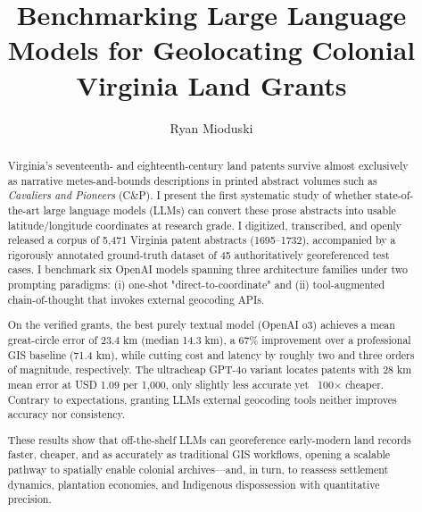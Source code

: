 \documentclass{josis}
\begin{document}
\title{Benchmarking Large Language Models for Geolocating Colonial Virginia Land Grants}
\author{Ryan Mioduski}

\maketitle


\begin{abstract}
Virginia's seventeenth- and eighteenth-century land patents survive almost exclusively as narrative metes-and-bounds descriptions in printed abstract volumes such as \emph{Cavaliers and Pioneers} (C\&P). I present the first systematic study of whether state-of-the-art large language models (LLMs) can convert these prose abstracts into usable latitude/longitude coordinates at research grade. I digitized, transcribed, and openly released a corpus of 5,471 Virginia patent abstracts (1695–1732), accompanied by a rigorously annotated ground-truth dataset of 45 authoritatively georeferenced test cases. I benchmark six OpenAI models spanning three architecture families under two prompting paradigms: (i) one-shot "direct-to-coordinate" and (ii) tool-augmented chain-of-thought that invokes external geocoding APIs.

On the verified grants, the best purely textual model (OpenAI o3) achieves a mean great-circle error of 23.4 km (median 14.3 km), a 67\% improvement over a professional GIS baseline (71.4 km), while cutting cost and latency by roughly two and three orders of magnitude, respectively. The ultracheap GPT-4o variant locates patents with 28 km mean error at USD 1.09 per 1,000, only slightly less accurate yet ~100× cheaper. Contrary to expectations, granting LLMs external geocoding tools neither improves accuracy nor consistency.

These results show that off-the-shelf LLMs can georeference early-modern land records faster, cheaper, and as accurately as traditional GIS workflows, opening a scalable pathway to spatially enable colonial archives—and, in turn, to reassess settlement dynamics, plantation economies, and Indigenous dispossession with quantitative precision.
\end{abstract}





\end{document}

